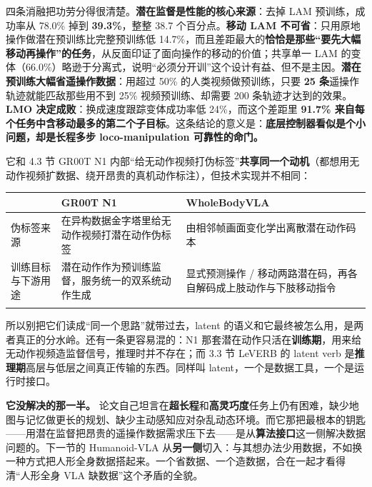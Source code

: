 \documentclass[
  chinese,
]{ctexart}
\begin{document}
四条消融把功劳分得很清楚。\textbf{潜在监督是性能的核心来源}：去掉 LAM
预训练，成功率从 78.0\% 掉到 \textbf{39.3\%}，整整 38.7
个百分点。\textbf{移动 LAM
不可省}：只用原地操作做潜在预训练比完整预训练低
14.7\%，而且差距最大的\textbf{恰恰是那些``要先大幅移动再操作''的任务}，从反面印证了面向操作的移动的价值；共享单一
LAM
的变体（66.0\%）略逊于分离式，说明``必须分开训''这个设计有益、但不是主因。\textbf{潜在预训练大幅省遥操作数据}：用超过
50\% 的人类视频做预训练，只要 \textbf{25 条}遥操作轨迹就能匹敌那些用不到
25\% 视频预训练、却需要 200 条轨迹才达到的效果。\textbf{LMO
决定成败}：换成速度跟踪变体成功率低 24\%，而这个差距里 \textbf{91.7\%
来自每个任务中含移动最多的第二个子目标}。这条结论的意义是：\textbf{底层控制器看似是个小问题，却是长程多步
loco-manipulation 可靠性的命门。}

它和 4.3 节 GR00T N1
内部``给无动作视频打伪标签''\textbf{共享同一个动机}（都想用无动作视频扩数据、绕开昂贵的真机动作标注），但技术实现并不相同：

\begin{center}
\begin{tabular}{@{}>{\raggedright\arraybackslash}p{} >{\raggedright\arraybackslash}p{} >{\raggedright\arraybackslash}p{}@{}}
\toprule\noalign{}
 & GR00T N1 & WholeBodyVLA \\
\midrule\noalign{}
伪标签来源 & 在异构数据金字塔里给无动作视频打潜在动作伪标签 & 由相邻帧画面变化学出离散潜在动作码本 \\
训练目标与下游用途 & 潜在动作作为预训练监督，服务统一的双系统动作生成 & 显式预测操作 / 移动两路潜在码，再各自解码成上肢动作与下肢移动指令 \\
\bottomrule\noalign{}
\end{tabular}
\end{center}

所以别把它们读成``同一个思路''就带过去，latent
的语义和它最终被怎么用，是两者真正的分水岭。还有一条更容易混的：N1
那套潜在动作只活在\textbf{训练期}，用来给无动作视频造监督信号，推理时并不存在；而
3.3 节 LeVERB 的 latent verb
是\textbf{推理期}高层与低层之间真正传输的东西。同样叫
latent，一个是数据工具，一个是运行时接口。

\textbf{它没解决的那一半。}
论文自己坦言在\textbf{超长程}和\textbf{高灵巧度}任务上仍有困难，缺少地图与记忆做更长的规划、缺少主动感知应对杂乱动态环境。而它那把最根本的钥匙------用潜在监督把昂贵的遥操作数据需求压下去------是从\textbf{算法接口}这一侧解决数据问题的。下一节的
Humanoid-VLA
从\textbf{另一侧}切入：与其想办法少用数据，不如换一种方式把人形全身数据搭起来。一个省数据、一个造数据，合在一起才看得清``人形全身
VLA 缺数据''这个矛盾的全貌。
\end{document}
